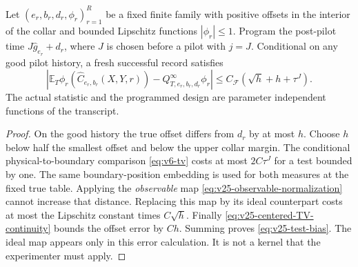 \begin{proposition}
\label{prop:v25-test-implementation}
Let \((e_r,b_r,d_r,\phi_r)_{r=1}^R\) be a fixed finite family with positive
offsets in the interior of the collar and bounded Lipschitz functions
\(|\phi_r|\le1\).  Program the post-pilot time
\(J\widehat g_{e_r}+d_r\), where \(J\) is chosen before a pilot with
\(j=J\).  Conditional on any good pilot history, a fresh successful record
satisfies
\begin{equation}\label{eq:v25-test-bias}
 \left|\mathbb E_T\phi_r(\widehat C_{e_r,b_r}(X,Y,r))
              -Q_{T,e_r,b_r,d_r}^{\infty}\phi_r\right|
       \le C_{\mathscr F}(\sqrt h+h+\tau^J).
\end{equation}
The actual statistic and the programmed design are parameter independent
functions of the transcript.
\end{proposition}

\begin{proof}
On the good history the true offset differs from \(d_r\) by at most \(h\).
Choose \(h\) below half the smallest offset and below the upper collar
margin.  The conditional physical-to-boundary comparison
\eqref{eq:v6-tv} costs at most \(2C\tau^J\) for a test bounded by one.
The same boundary-position embedding is used for both measures at the fixed
true table.  Applying the \emph{observable} map
\eqref{eq:v25-observable-normalization} cannot increase that distance.
Replacing this map by its ideal counterpart costs at most the Lipschitz
constant times \(C\sqrt h\).  Finally
\eqref{eq:v25-centered-TV-continuity} bounds the offset error by \(Ch\).
Summing proves \eqref{eq:v25-test-bias}.  The ideal map appears only in this
error calculation.  It is not a kernel that the experimenter must apply.
\end{proof}
